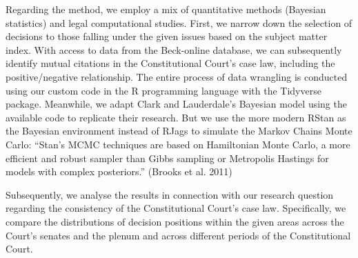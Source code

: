\documentclass[
  11pt,
]{article}
\begin{document}
Regarding the method, we employ a mix of quantitative methods (Bayesian
statistics) and legal computational studies. First, we narrow down the
selection of decisions to those falling under the given issues based on
the subject matter index. With access to data from the Beck-online
database, we can subsequently identify mutual citations in the
Constitutional Court's case law, including the positive/negative
relationship. The entire process of data wrangling is conducted using
our custom code in the R programming language with the Tidyverse
package. Meanwhile, we adapt Clark and Lauderdale's Bayesian model using
the available code to replicate their research. But we use the more
modern RStan as the Bayesian environment instead of RJags to simulate
the Markov Chains Monte Carlo: ``Stan's MCMC techniques are based on
Hamiltonian Monte Carlo, a more efficient and robust sampler than Gibbs
sampling or Metropolis Hastings for models with complex posteriors.''
(Brooks et al. 2011)

Subsequently, we analyse the results in connection with our research
question regarding the consistency of the Constitutional Court's case
law. Specifically, we compare the distributions of decision positions
within the given areas across the Court's senates and the plenum and
across different periods of the Constitutional Court.
\end{document}
